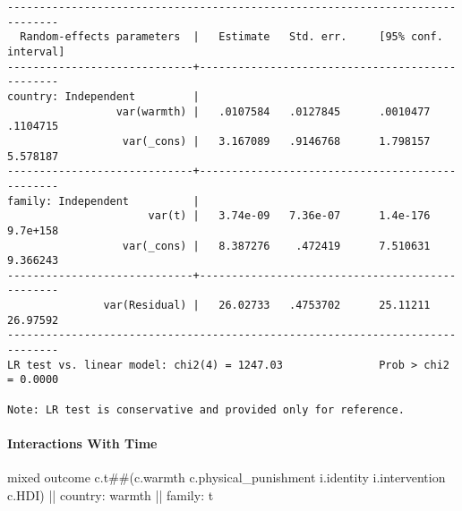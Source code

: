 \documentclass[
  letterpaper,
  DIV=11,
  numbers=noendperiod]{scrreprt}
\let\oldparagraph\paragraph
\renewcommand{\paragraph}[1]{\oldparagraph{#1}\mbox{}}
\newenvironment{Shaded}{\begin{snugshade}}{\end{snugshade}}
\newcommand{\KeywordTok}[1]{\textcolor[rgb]{0.00,0.23,0.31}{#1}}
\newcommand{\NormalTok}[1]{\textcolor[rgb]{0.00,0.23,0.31}{#1}}
\begin{document}
\begin{verbatim}
------------------------------------------------------------------------------
  Random-effects parameters  |   Estimate   Std. err.     [95% conf. interval]
-----------------------------+------------------------------------------------
country: Independent         |
                 var(warmth) |   .0107584   .0127845      .0010477    .1104715
                  var(_cons) |   3.167089   .9146768      1.798157    5.578187
-----------------------------+------------------------------------------------
family: Independent          |
                      var(t) |   3.74e-09   7.36e-07      1.4e-176    9.7e+158
                  var(_cons) |   8.387276    .472419      7.510631    9.366243
-----------------------------+------------------------------------------------
               var(Residual) |   26.02733   .4753702      25.11211    26.97592
------------------------------------------------------------------------------
LR test vs. linear model: chi2(4) = 1247.03               Prob > chi2 = 0.0000

Note: LR test is conservative and provided only for reference.
\end{verbatim}

\paragraph{Interactions With Time}\label{interactions-with-time}

\begin{Shaded}
\begin{Highlighting}[]
\NormalTok{mixed outcome c.t\#\#(c.warmth c.physical\_punishment i.}\KeywordTok{identity}\NormalTok{ i.intervention c.HDI) || country: warmth || }\KeywordTok{family}\NormalTok{: t}
\end{Highlighting}
\end{Shaded}
\end{document}
